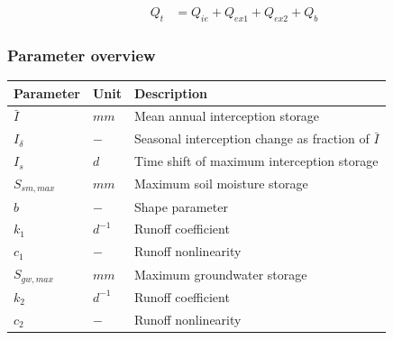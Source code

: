 \begin{align}
	Q_t &= Q_{ie}+Q_{ex1}+Q_{ex2}+Q_b
\end{align}

\newpage
\subsubsection{Parameter overview}
\begin{table}[htbp]
  \centering
    \begin{tabular}{lll}
    \toprule
    Parameter & Unit  & Description \\
    \midrule
    $\bar{I}$ & $mm$  & Mean annual interception storage \\
    $I_{\delta}$ & $-$   & Seasonal interception change as fraction of $\bar{I}$ \\
    $I_s$ & $d$   & Time shift of maximum interception storage \\
    $S_{sm,max}$ & $mm$  & Maximum soil moisture storage \\
    $b$   & $-$   & Shape parameter \\
    $k_1$ & $d^{-1}$ & Runoff coefficient \\
    $c_1$ & $-$   & Runoff nonlinearity \\
    $S_{gw,max}$ & $mm$  & Maximum groundwater storage \\
    $k_2$ & $d^{-1}$ & Runoff coefficient \\
    $c_2$ & $-$   & Runoff nonlinearity \\
    \bottomrule
    \end{tabular}%
  \label{tab:addlabel}%
\end{table}%
